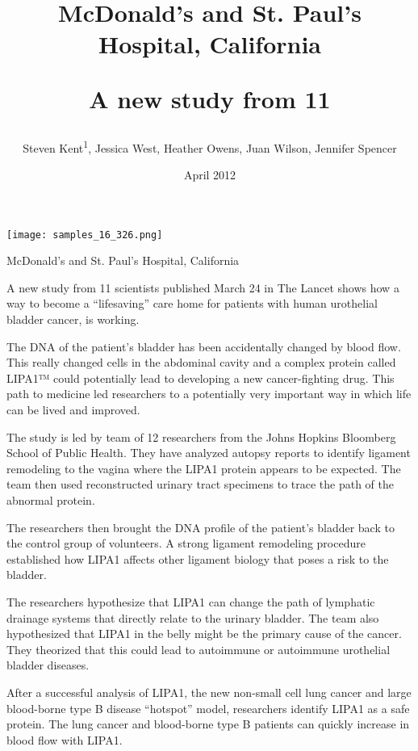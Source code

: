 \documentclass{article}
\title{McDonald’s and St. Paul’s Hospital, California

A new study from 11}
\author{Steven Kent\textsuperscript{1},  Jessica West,  Heather Owens,  Juan Wilson,  Jennifer Spencer}
\affil{\textsuperscript{1}Hong Kong Hospital Authority}
\date{April 2012}
\begin{document}
\maketitle

\begin{center}
\begin{minipage}{0.75\linewidth}
\texttt{[image: samples\_16\_326.png]}
\end{minipage}
\end{center}

McDonald’s and St. Paul’s Hospital, California

A new study from 11 scientists published March 24 in The Lancet shows how a way to become a “lifesaving” care home for patients with human urothelial bladder cancer, is working.

The DNA of the patient’s bladder has been accidentally changed by blood flow. This really changed cells in the abdominal cavity and a complex protein called LIPA1™ could potentially lead to developing a new cancer-fighting drug. This path to medicine led researchers to a potentially very important way in which life can be lived and improved.

The study is led by team of 12 researchers from the Johns Hopkins Bloomberg School of Public Health. They have analyzed autopsy reports to identify ligament remodeling to the vagina where the LIPA1 protein appears to be expected. The team then used reconstructed urinary tract specimens to trace the path of the abnormal protein.

The researchers then brought the DNA profile of the patient’s bladder back to the control group of volunteers. A strong ligament remodeling procedure established how LIPA1 affects other ligament biology that poses a risk to the bladder.

The researchers hypothesize that LIPA1 can change the path of lymphatic drainage systems that directly relate to the urinary bladder. The team also hypothesized that LIPA1 in the belly might be the primary cause of the cancer. They theorized that this could lead to autoimmune or autoimmune urothelial bladder diseases.

After a successful analysis of LIPA1, the new non-small cell lung cancer and large blood-borne type B disease “hotspot” model, researchers identify LIPA1 as a safe protein. The lung cancer and blood-borne type B patients can quickly increase in blood flow with LIPA1.
\end{document}
